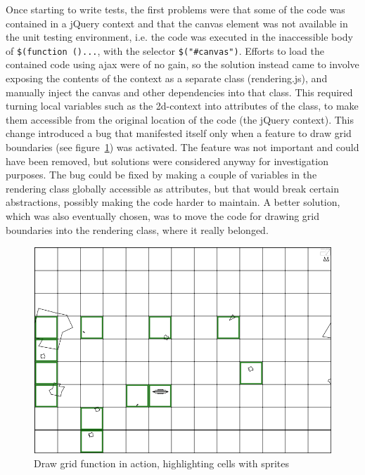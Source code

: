 \documentclass[11pt]{article}
\begin{document}
Once starting to write tests, the first problems were that some of the code was contained in a jQuery context and that the canvas element was not available in the unit testing environment, i.e. the code was executed in the inaccessible body of \texttt{\$(function ()...}, with the selector \texttt{\$("\#canvas")}. Efforts to load the contained code using ajax were of no gain, so the solution instead came to involve exposing the contents of the context as a separate class (rendering.js), and manually inject the canvas and other dependencies into that class. This required turning local variables such as the 2d-context into attributes of the class, to make them accessible from the original location of the code (the jQuery context). This change introduced a bug that manifested itself only when a feature to draw grid boundaries (see figure~\ref{fig:game8}) was activated. The feature was not important and could have been removed, but solutions were considered anyway for investigation purposes. The bug could be fixed by making a couple of variables in the rendering class globally accessible as attributes, but that would break certain abstractions, possibly making the code harder to maintain. A better solution, which was also eventually chosen, was to move the code for drawing grid boundaries into the rendering class, where it really belonged.

\begin{figure}[ht!]
\centering
\includegraphics[width=1.0\textwidth]{pics/game8.png}
\caption{Draw grid function in action, highlighting cells with sprites}
\label{fig:game8}
\end{figure}
\end{document}
